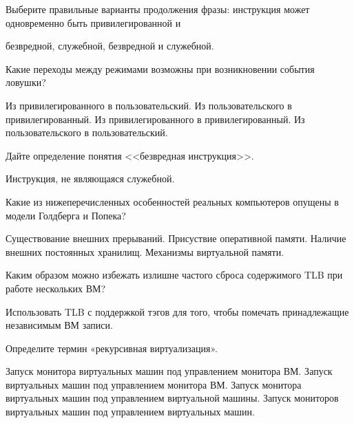 \begin{questions}

\question[3] Выберите правильные варианты продолжения фразы: инструкция может одновременно быть привилегированной и
\begin{choices}
\choice безвредной,
\correctchoice служебной,
\choice безвредной и служебной.
\end{choices}

\question[3] Какие переходы между режимами возможны при возникновении события ловушки?
\begin{choices}
\choice        Из привилегированного в пользовательский.
\correctchoice Из пользовательского в привилегированный.
\correctchoice Из привилегированного в привилегированный.
\choice        Из пользовательского в пользовательский.
\end{choices}

\question[3] Дайте определение понятия <<безвредная инструкция>>.
\begin{solution}[1cm]
Инструкция, не являющаяся служебной.
\end{solution}

\question[3] Какие из нижеперечисленных особенностей реальных компьютеров опущены в модели Голдберга и Попека?
\begin{choices}
    \correctchoice Существование внешних прерываний.
    \choice Присуствие оперативной памяти.
    \correctchoice Наличие внешних постоянных хранилищ.
    \choice Механизмы виртуальной памяти.
\end{choices}

\question[3] Каким образом можно избежать излишне частого сброса содержимого TLB при работе нескольких ВМ?
\begin{solution}[1cm]
Использовать TLB с поддержкой тэгов для того, чтобы помечать принадлежащие независимым ВМ записи.
\end{solution}

\question[3] Определите термин «рекурсивная виртуализация».
\begin{choices}
    \correctchoice Запуск монитора виртуальных машин под управлением монитора ВМ.
    \choice Запуск виртуальных машин под управлением монитора ВМ.
    \choice Запуск монитора виртуальных машин под управлением виртуальной машины.
    \choice Запуск мониторов виртуальных машин под управлением виртуальных машин.
\end{choices}


\end{questions}
